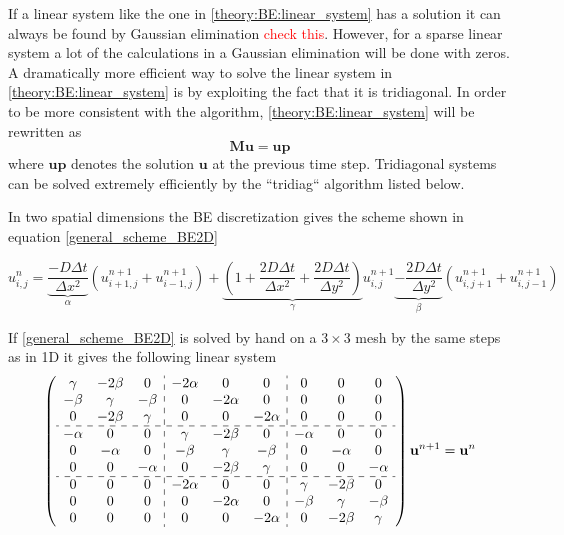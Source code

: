 \noindent If a linear system like the one in \eqref{theory:BE:linear_system} has a solution it can always be found by Gaussian elimination \textcolor{red}{check this}. 
However, for a sparse linear system a lot of the calculations in a Gaussian elimination will be done with zeros. 
A dramatically more efficient way to solve the linear system in \eqref{theory:BE:linear_system} is by exploiting the fact that it is tridiagonal. 
In order to be more consistent with the algorithm, \eqref{theory:BE:linear_system} will be rewritten as
\begin{equation}
  \mathbf{M}\mathbf{u} = \mathbf{up}
\end{equation}
where $\mathbf{up}$ denotes the solution $\mathbf{u}$ at the previous time step. 
Tridiagonal systems can be solved extremely efficiently by the ``tridiag`` algorithm listed below.



In two spatial dimensions the BE discretization gives the scheme shown in equation \eqref{general_scheme_BE2D}

\begin{equation}\label{general_scheme_BE2D}
 u^{n}_{i,j} = \underbrace{\frac{-D\Delta t}{\Delta x^2}}_{\alpha}\left(u^{n+1}_{i+1,j}+u^{n+1}_{i-1,j}\right) +
 \underbrace{\left(1+\frac{2D\Delta t}{\Delta x^2} +\frac{2D\Delta t}{\Delta y^2}\right)}_{\gamma}u^{n+1}_{i,j} 
 \underbrace{-\frac{2D\Delta t}{\Delta y^2}}_{\beta}\left(u^{n+1}_{i,j+1}+u^{n+1}_{i,j-1}\right)
\end{equation}

\noindent If \eqref{general_scheme_BE2D} is solved by hand on a $3\times3$ mesh by the same steps as in 1D it gives the following linear system
\begin{align}\label{linear_system_BE2D}
  \left(\begin{array}{c c c : c c c : c c c}
        \gamma & -2\beta &0 &-2\alpha &0 &0 &0 &0 &0\\
        -\beta & \gamma & -\beta &0 &-2\alpha &0 &0 &0 &0\\
        0&-2\beta & \gamma & 0 & 0 & -2\alpha &0&0&0\\ \hdashline
        -\alpha& 0&0 & \gamma & -2\beta & 0 & -\alpha &0&0\\
        0& -\alpha&0&-\beta & \gamma & -\beta & 0 & -\alpha &0\\
        0& 0& -\alpha&0&-2\beta & \gamma & 0 & 0 &-\alpha\\ \hdashline
        0& 0 &0 &-2\alpha &0&0 & \gamma & -2\beta&0\\
        0& 0 &0 &0 &-2\alpha&0&-\beta & \gamma &-\beta\\
         0&0 &0 &0&0 &-2\alpha&0&-2\beta & \gamma
       \end{array}\right)\mathbf{u}^{n+1} = \mathbf{u}^{n}
\end{align}

